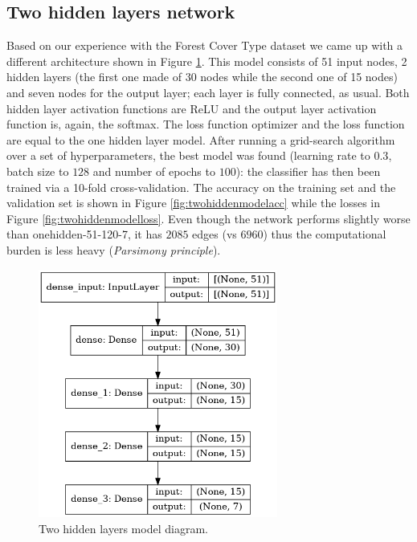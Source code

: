 \subsection{Two hidden layers network}
\label{sec:twohidden}
Based on our experience with the Forest Cover Type dataset we came up with a different architecture shown in Figure \ref{fig:twohiddenmodel}. This model consists of 51 input nodes, 2 hidden layers (the first one made of 30 nodes while the second one of 15 nodes) and seven nodes for the output layer; each layer is fully connected, as usual. Both hidden layer activation functions are ReLU and the output layer activation function is, again, the softmax. The loss function optimizer and the loss function are equal to the one hidden layer model.
After running a grid-search algorithm over a set of hyperparameters, the best model was found (learning rate to $0.3$, batch size to $128$ and number of epochs to $100$): the classifier has then been trained via a 10-fold cross-validation. The accuracy on the training set and the validation set is shown in Figure \ref{fig:twohiddenmodelacc} while the losses in Figure \ref{fig:twohiddenmodelloss}. Even though the network performs slightly worse than onehidden-51-120-7, it has $2085$ edges (vs $6960$) thus the computational burden is less heavy (\textit{Parsimony principle}\cite{gori}).
\begin{figure}
\centering
\includegraphics[width=0.7\textwidth]{./TeX_files/img/twohiddenmodel.png}
\caption{Two hidden layers model diagram.}
\label{fig:twohiddenmodel}
\end{figure}

